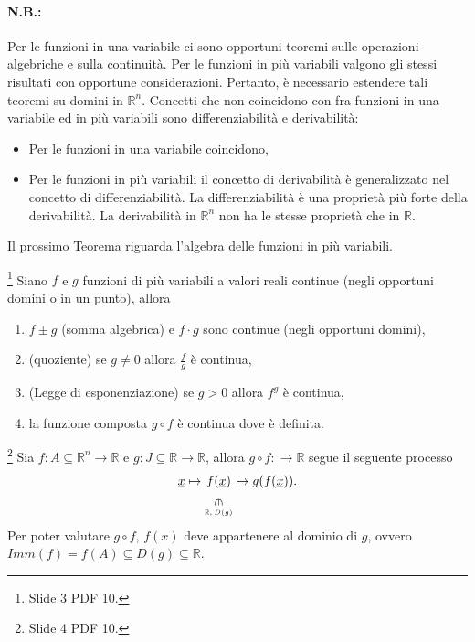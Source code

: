 \paragraph{N.B.:} Per le funzioni in una variabile ci sono opportuni teoremi sulle operazioni algebriche e sulla continuità. Per le funzioni in più variabili valgono gli stessi risultati con opportune considerazioni. Pertanto, è necessario estendere tali teoremi su domini in $\mathbb R^n$. Concetti che non coincidono con fra funzioni in una variabile ed in più variabili sono differenziabilità e derivabilità:
\begin{itemize}
    \item Per le funzioni in una variabile coincidono,
    \item Per le funzioni in più variabili il concetto di derivabilità è generalizzato nel concetto di differenziabilità. La differenziabilità è una proprietà più forte della derivabilità. La derivabilità in $\mathbb R^n$ non ha le stesse proprietà che in $\mathbb R$.
\end{itemize}

Il prossimo Teorema riguarda l'algebra delle funzioni in più variabili.
\begin{theorem}\label{th:algebra_funzioni_piu_variabili}\footnote{Slide 3 PDF 10.}
    Siano $f$ e $g$ funzioni di più variabili a valori reali continue (negli opportuni domini o in un punto), allora
    \begin{enumerate}
        \item $f\pm g$ (somma algebrica) e $f\cdot g$ sono continue (negli opportuni domini),
        \item (quoziente) se $g\neq 0$ allora $\frac{f}{g}$ è continua,
        \item (Legge di esponenziazione) se $g>0$ allora $f^g$ è continua,
        \item la funzione composta $g\circ f$ è continua dove è definita.
    \end{enumerate}
\end{theorem}

\begin{remark}\footnote{Slide 4 PDF 10.}
    Sia $f\colon A\subseteq\mathbb R^n\rightarrow\mathbb R$ e $g:J\subseteq\mathbb R\rightarrow\mathbb R$, allora $g\circ f\colon \mathbb\rightarrow\mathbb R$ segue il seguente processo
    \begin{equation*}
        \uline x\mapsto \underset{\underset{\mathbb R,\, D(g)}{\vertin}}{f(\uline x)}\mapsto g(f(\uline x)).
    \end{equation*}
    Per poter valutare $g\circ f$, $f(x)$ deve appartenere al dominio di $g$, ovvero $Imm(f)=f(A)\subseteq D(g)\subseteq\mathbb R$.
\end{remark}

